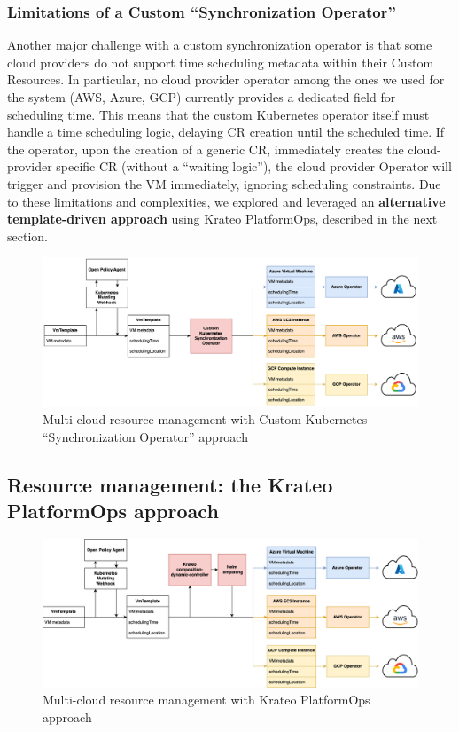 \subsubsection{Limitations of a Custom ``Synchronization Operator''}
\label{sec:limitations_custom_operator}

Another major challenge with a custom synchronization operator is that some cloud providers do not support time scheduling metadata within their Custom Resources. 
In particular, no cloud provider operator among the ones we used for the system (AWS, Azure, GCP) currently provides a dedicated field for scheduling time.
This means that the custom Kubernetes operator itself must handle a time scheduling logic, delaying CR creation until the scheduled time.
If the operator, upon the creation of a generic CR, immediately creates the cloud-provider specific CR (without a ``waiting logic''), the cloud provider Operator will trigger and provision the VM immediately, ignoring scheduling constraints.
Due to these limitations and complexities, we explored and leveraged an \textbf{alternative template-driven approach} using Krateo PlatformOps, described in the next section.

\begin{figure}[htb]
  \centering
  \includegraphics[width=1\linewidth]{images/k8s_operator.png}
  \caption{Multi-cloud resource management with Custom Kubernetes ``Synchronization Operator'' approach}
  \label{fig:k8s_operator}
\end{figure}

\subsection{Resource management: the Krateo PlatformOps approach}

\begin{figure}[htb]
  \centering
  \includegraphics[width=1\linewidth]{images/krateo.png}
  \caption{Multi-cloud resource management with Krateo PlatformOps approach}
  \label{fig:krateo}
\end{figure}

